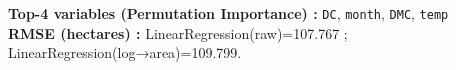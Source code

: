 \textbf{Top-4 variables (Permutation Importance) :} \texttt{DC}, \texttt{month}, \texttt{DMC}, \texttt{temp}\\
\textbf{RMSE (hectares) :} LinearRegression(raw)=107.767 ; LinearRegression(log→area)=109.799.